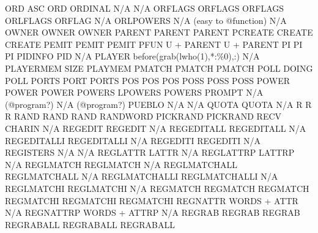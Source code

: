 \documentclass[letterpaper,10pt,english]{sphinxmanual}
\begin{document}
\begin{description}
ORD                     ASC                          ORD
ORDINAL                 N/A                          N/A
ORFLAGS                 ORFLAGS                      ORFLAGS
ORLFLAGS                ORFLAG                       N/A
ORLPOWERS               N/A (easy to @function)      N/A
OWNER                   OWNER                        OWNER
PARENT                  PARENT                       PARENT
PCREATE                 CREATE                       CREATE
PEMIT                   PEMIT                        PEMIT
PFUN                    U + PARENT                   U + PARENT
PI                      PI                           PI
PIDINFO                 PID                          N/A
PLAYER                  before(grab(lwho(1),*:\%0),:) N/A
PLAYERMEM               SIZE                         PLAYMEM
PMATCH                  PMATCH                       PMATCH
POLL                    DOING                        POLL
PORTS                   PORT                         PORTS
POS                     POS                          POS
POSS                    POSS                         POSS
POWER                   POWER                        POWER
POWERS                  LPOWERS                      POWERS
PROMPT                  N/A (@program?)              N/A (@program?)
PUEBLO                  N/A                          N/A
QUOTA                   QUOTA                        N/A
R                       R                            R
RAND                    RAND                         RAND
RANDWORD                PICKRAND                     PICKRAND
RECV                    CHARIN                       N/A
REGEDIT                 REGEDIT                      N/A
REGEDITALL              REGEDITALL                   N/A
REGEDITALLI             REGEDITALLI                  N/A
REGEDITI                REGEDITI                     N/A
REGISTERS               N/A                          N/A
REGLATTR                LATTR                        N/A
REGLATTRP               LATTRP                       N/A
REGLMATCH               REGLMATCH                    N/A
REGLMATCHALL            REGLMATCHALL                 N/A
REGLMATCHALLI           REGLMATCHALLI                N/A
REGLMATCHI              REGLMATCHI                   N/A
REGMATCH                REGMATCH                     REGMATCH
REGMATCHI               REGMATCHI                    REGMATCHI
REGNATTR                WORDS + ATTR                 N/A
REGNATTRP               WORDS + ATTRP                N/A
REGRAB                  REGRAB                       REGRAB
REGRABALL               REGRABALL                    REGRABALL

\end{description}
\end{document}
